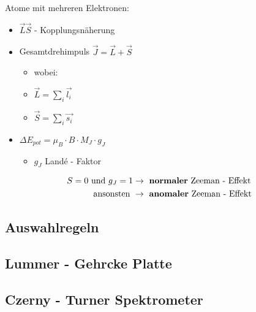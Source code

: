         \begin{myframe}{\subsecname}
            Atome mit mehreren Elektronen:
            \begin{itemize}
                \item $\vec{L} \vec{S}$ - Kopplungsnäherung
                \item Gesamtdrehimpuls $\vec{J} = \vec{L} + \vec{S}$
                \begin{itemize}
                    \item[] wobei:
                    \item $\vec{L} = \sum_i \vec{l_i}$
                    \item $\vec{S} = \sum_i \vec{s_i}$
                \end{itemize}
                \item $\Delta E_{pot} = \mu_B \cdot B \cdot M_J \cdot g_J $
                \begin{itemize}
                    \item $ g_{J}$ Landé - Faktor
                \end{itemize}
            \end{itemize}
            \begin{align*}
              S = 0 \text{ und } g_{J} = 1 &\rightarrow \text{ \textbf{normaler} Zeeman - Effekt} \\
              \text{ ansonsten } &\rightarrow \text{ \textbf{anomaler} Zeeman - Effekt}
            \end{align*}
        \end{myframe}

        \begin{myframe}{\subsecname}


        \end{myframe}

    \subsection{Auswahlregeln}

    \subsection{Lummer - Gehrcke Platte}

    \subsection{Czerny - Turner Spektrometer}
